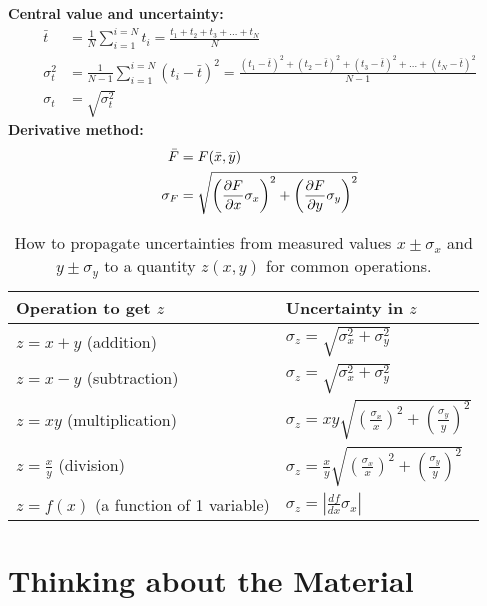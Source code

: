\begin{importantEquations}
\textbf{Central value and uncertainty:}\\
\begin{align*}
\bar t &= \frac{1}{N}\sum_{i=1}^{i=N} t_i=\frac{t_1 +t_2 +t_3 +\dots+ t_N}{N} \\
\sigma_t^2 &=\frac{1}{N-1}\sum_{i=1}^{i=N}(t_i-\bar t)^2 = \frac{(t_1-\bar t)^2+(t_2-\bar t)^2+(t_3-\bar t)^2+\dots+(t_N-\bar t)^2}{N-1} \\
\sigma_t &=\sqrt{\sigma_t^2}
\end{align*}
\textbf{Derivative method:}\\
\begin{align*}
\bar F &= F(\bar x, \bar y) \nonumber \\
\sigma_F &= \sqrt{\left(\frac{\partial F}{\partial x}\sigma_x \right)^2 + \left(\frac{\partial F}{\partial y}\sigma_y \right)^2 }
\end{align*}
\begin{table}[H]
\centering
\begin{tabular}{p{2.5in}p{2in}} 
\textbf{Operation to get $z$} &\textbf{Uncertainty in $z$} \\
\hline
\hline
$z=x+y$ (addition) &  $\sigma_z=\sqrt{\sigma_x^2+\sigma_y^2}$ \\ \hline
$z=x-y$ (subtraction) & $\sigma_z=\sqrt{\sigma_x^2+\sigma_y^2}$ \\ \hline
$z=xy$ (multiplication) & $\sigma_z=xy\sqrt{\left(\frac{\sigma_x}{x}\right)^2+\left(\frac{\sigma_y}{y}\right)^2}$ \\ \hline
$z=\frac{x}{y}$ (division) & $\sigma_z=\frac{x}{y}\sqrt{\left(\frac{\sigma_x}{x}\right)^2+\left(\frac{\sigma_y}{y}\right)^2}$ \\ \hline
$z=f(x)$ (a function of 1 variable) &$\sigma_z=\left|\frac{df}{dx}\sigma_x \right|$ \\ \hline
\end{tabular}
\caption{\label{tab:modelandexperiment:prop_uncertainties} How to propagate uncertainties from measured values $x\pm\sigma_x$ and $y\pm\sigma_y$ to a quantity $z(x,y)$ for common operations.}
\end{table}
\end{importantEquations}
\newpage
\section{Thinking about the Material}

